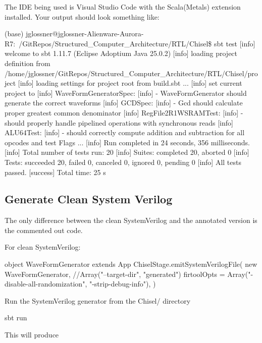 The IDE being used is Visual Studio Code with the Scala(Metals) extension installed. Your output should look something like:
\begin{bashcode}
(base) jglossner@jglossner-Alienware-Aurora-R7:~/GitRepos/Structured_Computer_Architecture/RTL/Chisel\$ sbt test
[info] welcome to sbt 1.11.7 (Eclipse Adoptium Java 25.0.2)
[info] loading project definition from /home/jglossner/GitRepos/Structured_Computer_Architecture/RTL/Chisel/project
[info] loading settings for project root from build.sbt ...
[info] set current project to %
[info] WaveFormGeneratorSpec:
[info] - WaveFormGenerator should generate the correct waveforms
[info] GCDSpec:
[info] - Gcd should calculate proper greatest common denominator
[info] RegFile2R1WSRAMTest:
[info] - should properly handle pipelined operations with synchronous reads
[info] ALU64Test:
[info] - should correctly compute addition and subtraction for all opcodes and test Flags
...
[info] Run completed in 24 seconds, 356 milliseconds.
[info] Total number of tests run: 20
[info] Suites: completed 20, aborted 0
[info] Tests: succeeded 20, failed 0, canceled 0, ignored 0, pending 0
[info] All tests passed.
[success] Total time: 25 s
\end{bashcode}

\subsection{Generate Clean System Verilog}
The only difference between the clean SystemVerilog and the annotated version is the commented out code.

For clean SystemVerilog:
\begin{chiselcode}
object WaveFormGenerator extends App {
  ChiselStage.emitSystemVerilogFile(
    new WaveFormGenerator,
    //Array("--target-dir", "generated")
    firtoolOpts = Array("-disable-all-randomization", "-strip-debug-info"),
  )
}
\end{chiselcode}

Run the SystemVerilog generator from the Chisel/ directory
\begin{bashcode}
sbt run
\end{bashcode}

This will produce


